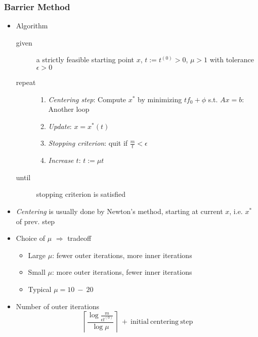 \subsubsection*{Barrier Method}
\begin{itemize}
    \item Algorithm
    \begin{description}
        \item[given] a strictly feasible starting point $x$, $t:=t^{(0)}>0$, $\mu>1$ with tolerance $\epsilon>0$
        \item[repeat] \phantom{}
        \begin{enumerate}
            \item \textit{Centering step}: Compute $x^\ast$ by minimizing $tf_0+\phi$ s.t. $Ax=b$: Another loop
            \item \textit{Update}: $x=x^\ast(t)$
            \item \textit{Stopping criterion}: quit if $\frac{m}{t}<\epsilon$
            \item \textit{Increase $t$}: $t:=\mu t$
        \end{enumerate}
        \item[until] stopping criterion is satisfied
    \end{description}
    \item \textit{Centering} is usually done by Newton's method, starting at current $x$, i.e. $x^\ast$ of prev. step
    \item Choice of $\mu$ $\Rightarrow$ tradeoff
    \begin{itemize}
        \item Large $\mu$: fewer outer iterations, more inner iterations
        \item Small $\mu$: more outer iterations, fewer inner iterations
        \item Typical $\mu=10~-~20$
    \end{itemize}
    \item Number of outer iterations
    \begin{equation}
        \left\lceil\frac{\log\frac{m}{\epsilon t^{(0)}}}{\log\mu}\right\rceil~+~\mathrm{initial~centering~step}
    \end{equation}
\end{itemize}
